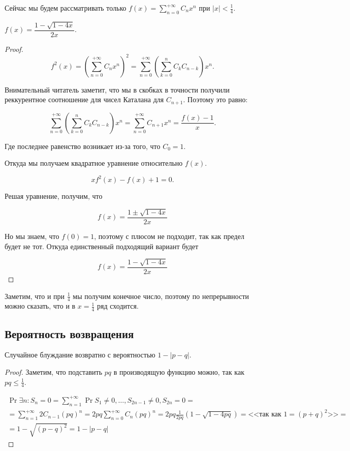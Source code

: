 Сейчас мы будем рассматривать только $f(x) = \sum\limits_{n = 0}^{+\infty}
C_n x^n$ при $|x| < \frac{1}{4}$.

\begin{theorem}
  $f(x) = \dfrac{1 - \sqrt{1 - 4x}}{2x}$.
\end{theorem}

\begin{proof}
  \[
    f^2(x) = \left(\sum\limits_{n = 0}^{+\infty} C_n x^n\right)^2 = 
    \sum\limits_{n = 0}^{+\infty}\left(\sum\limits_{k = 0}^{n} C_k C_{n - k}\right) x^n.
  \]

  Внимательный читатель заметит, что мы в скобках в точности получили реккурентное
  соотношение для чисел Каталана для $C_{n + 1}$. Поэтому это равно:

  \[
    \sum\limits_{n = 0}^{+\infty}\left(\sum\limits_{k = 0}^{n} C_k C_{n - k}\right) x^n
    = \sum\limits_{n = 0}^{+\infty} C_{n + 1}x^n = \frac{f(x) - 1}{x}.
  \]

  Где последнее равенство возникает из-за того, что $C_0 = 1$.

  Откуда мы получаем квадратное уравнение относительно $f(x)$.

  \[
    xf^2(x) - f(x) + 1 = 0.
  \]

  Решая уравнение, получим, что

  \[
    f(x) = \frac{1 \pm \sqrt{1 - 4x}}{2x}
  \]

  Но мы знаем, что $f(0) = 1$, поэтому с плюсом не подходит, так как предел
  будет не тот. Откуда единственный подходящий вариант будет

  \[
    f(x) = \frac{1 - \sqrt{1 - 4x}}{2x}
  \]
\end{proof}

Заметим, что и при $\frac{1}{4}$ мы получим конечное число, поэтому по непрерывности
можно сказать, что и в $x = \frac{1}{4}$ ряд сходится.

\subsection{Вероятность возвращения}

\begin{theorem}
  Случайное блуждание возвратно с вероятностью $1 - |p - q|$.
\end{theorem}

\begin{proof}
  Заметим, что подставить $pq$ в производящую функцию можно, так как 
  $pq \leqslant \frac{1}{4}$.

  \begin{multline}
    \Pr{\exists n : S_n = 0} = \sum\limits_{n = 1}^{+\infty} \Pr{S_1 \neq 0, 
    \ldots, S_{2n - 1} \neq 0, S_{2n} = 0} =\\= \sum\limits_{n = 1}^{+\infty}
    2C_{n - 1}(pq)^n = 2pq\sum\limits_{n = 0}^{+\infty} C_n (pq)^n =
    2pq\frac{1}{2pq}(1 - \sqrt{1 - 4pq}) = \text{<<так как $1 = (p + q)^2$>>} =\\=
    1 - \sqrt{(p - q)^2} = 1 - |p - q|
  \end{multline}
\end{proof}

